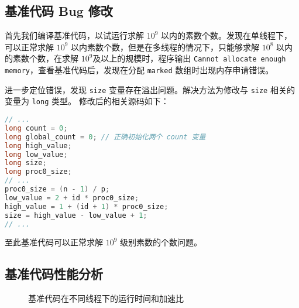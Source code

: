 \documentclass[11pt]{article}
\begin{document}
  \subsection{基准代码 Bug 修改}
  首先我们编译基准代码，以试运行求解 $10^9$ 以内的素数个数。发现在单线程下，可以正常求解 $10^9$ 以内素数个数，但是在多线程的情况下，只能够求解 $10^8$ 以内的素数个数，在求解 $10^9$及以上的规模时，程序输出 \lstinline{Cannot allocate enough memory}，查看基准代码后，发现在分配 \verb|marked| 数组时出现内存申请错误。

  进一步定位错误，发现 \verb|size| 变量存在溢出问题。解决方法为修改与 \verb|size| 相关的变量为 \verb|long| 类型。 修改后的相关源码如下：
  \begin{file}
    \begin{lstlisting}[language=C++]
// ...
long count = 0;
long global_count = 0; // 正确初始化两个 count 变量
long high_value; 
long low_value;
long size;
long proc0_size;
// ...
proc0_size = (n - 1) / p;
low_value = 2 + id * proc0_size;
high_value = 1 + (id + 1) * proc0_size;
size = high_value - low_value + 1;
// ...
    \end{lstlisting}
  \end{file}

  至此基准代码可以正常求解 $10^9$ 级别素数的个数问题。

  \subsection{基准代码性能分析}
  \begin{figure}[h]
    \centering
    \label{fig:baseline}
    \caption{基准代码在不同线程下的运行时间和加速比}
  
  \end{figure}
\end{document}
